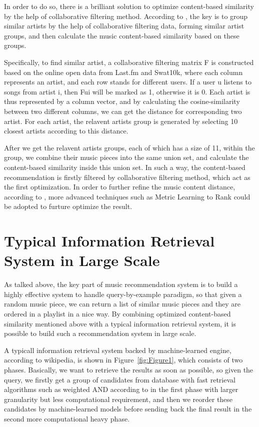 \documentclass[jou]{apa6}
\begin{document}
In order to do so, there is a brilliant solution to optimize content-based similarity 
by the help of collaborative filtering method. According to \textcite{mcfee2010learning},
the key is to group similar artists by the help of collaborative filtering data, forming 
similar artist groups, and then calculate the music content-based similarity based on these
groups.

Specifically, to find similar artist, a collaborative filtering matrix \textsf{F} is constructed
based on the online open data from Last.fm and Swat10k, where
each column represents an artist, and each row stands for different users. If a user \textsf{u} 
listens to songs from artist \textsf{i}, then \textsf{Fui} will be marked as 1, otherwise it is 0. Each artist is thus represented by a column vector, and by calculating the 
cosine-similarity between two different columns, we can get the distance for corresponding two artist. 
For each artist, the relavent artists group is generated by selecting 10 closest artists 
according to this distance.

After we get the relavent artists groups, each of which has a size of 11, within the group, 
we combine their music pieces into the same union set, and calculate the content-based similarity
inside this union set. In such a way, the content-based recommendation is firstly filtered by 
collaborative filtering method, which act as the first optimization. In order to further 
refine the music content distance, according to \textcite{mcfee2010metric}, more advanced 
techniques such as Metric Learning to Rank could be adopted to furture optimize the result.

\section{Typical Information Retrieval System in Large Scale}

As talked above, the key part of music recommendation system is to build a highly 
effective system to handle query-by-example paradigm, so that given a random music piece, 
we can return a list of similar music pieces and they are ordered in a playlist in a nice way. 
By combining optimized content-based similarity mentioned above with a typical information
 retrieval system, it is possible to build such a recommendation system in large scale.

A typicall information retrieval system backed by machine-learned engine, according to wikipedia, is shown in 
Figure~\ref{fig:Figure1}, which consists of two phases. Basically, we want to retrieve the 
results as soon as possible, so given the query, we firstly get a group of candidates from 
database with fast retrieval algorithms such as weighted AND according to 
\textcite{broder2003efficient} in the first phase with larger granularity but less 
computational requirement, and then we reorder these candidates by machine-learned 
models before sending back the final result in the second more computational heavy phase.
\end{document}
